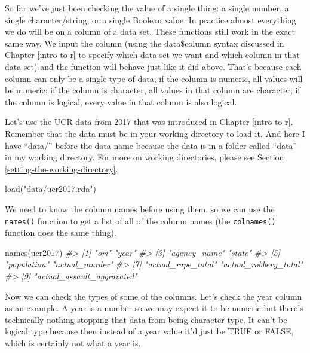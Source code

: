 \documentclass[
]{krantz}
\makeatletter
\newenvironment{Shaded}{\begin{snugshade}}{\end{snugshade}}
\newcommand{\CommentTok}[1]{\textcolor[rgb]{0.37,0.37,0.37}{\textit{#1}}}
\newcommand{\FunctionTok}[1]{\textcolor[rgb]{0,0,0}{#1}}
\newcommand{\NormalTok}[1]{#1}
\newcommand{\StringTok}[1]{\textcolor[rgb]{0.5,0.5,0.5}{#1}}
\newenvironment{kframe}{%
\medskip{}
\setlength{\fboxsep}{.8em}
 \def\at@end@of@kframe{}%
 \ifinner\ifhmode%
  \def\at@end@of@kframe{\end{minipage}}%
  \begin{minipage}{\columnwidth}%
 \fi\fi%
 \def\FrameCommand##1{\hskip\@totalleftmargin \hskip-\fboxsep
 \colorbox{shadecolor}{##1}\hskip-\fboxsep
     \hskip-\linewidth \hskip-\@totalleftmargin \hskip\columnwidth}%
 \MakeFramed {\advance\hsize-\width
   \@totalleftmargin\z@ \linewidth\hsize
   \@setminipage}}%
 {\par\unskip\endMakeFramed%
 \at@end@of@kframe}
\renewenvironment{Shaded}{\begin{kframe}}{\end{kframe}}
\makeatother
\begin{document}
So far we've just been checking the value of a single thing: a single number, a single character/string, or a single Boolean value. In practice almost everything we do will be on a column of a data set. These functions still work in the exact same way. We input the column (using the data\$column syntax discussed in Chapter \ref{intro-to-r} to specify which data set we want and which column in that data set) and the function will behave just like it did above. That's because each column can only be a single type of data; if the column is numeric, all values will be numeric; if the column is character, all values in that column are character; if the column is logical, every value in that column is also logical.

Let's use the UCR data from 2017 that was introduced in Chapter \ref{intro-to-r}. Remember that the data must be in your working directory to load it. And here I have ``data/'' before the data name because the data is in a folder called ``data'' in my working directory. For more on working directories, please see Section \ref{setting-the-working-directory}.

\begin{Shaded}
\begin{Highlighting}[]
\FunctionTok{load}\NormalTok{(}\StringTok{"data/ucr2017.rda"}\NormalTok{)}
\end{Highlighting}
\end{Shaded}

We need to know the column names before using them, so we can use the \texttt{names()} function to get a list of all of the column names (the \texttt{colnames()} function does the same thing).

\begin{Shaded}
\begin{Highlighting}[]
\FunctionTok{names}\NormalTok{(ucr2017)}
\CommentTok{\#\textgreater{} [1] "ori"                       "year"                     }
\CommentTok{\#\textgreater{} [3] "agency\_name"               "state"                    }
\CommentTok{\#\textgreater{} [5] "population"                "actual\_murder"            }
\CommentTok{\#\textgreater{} [7] "actual\_rape\_total"         "actual\_robbery\_total"     }
\CommentTok{\#\textgreater{} [9] "actual\_assault\_aggravated"}
\end{Highlighting}
\end{Shaded}

Now we can check the types of some of the columns. Let's check the year column as an example. A year is a number so we may expect it to be numeric but there's technically nothing stopping that data from being character type. It can't be logical type because then instead of a year value it'd just be TRUE or FALSE, which is certainly not what a year is.
\end{document}

